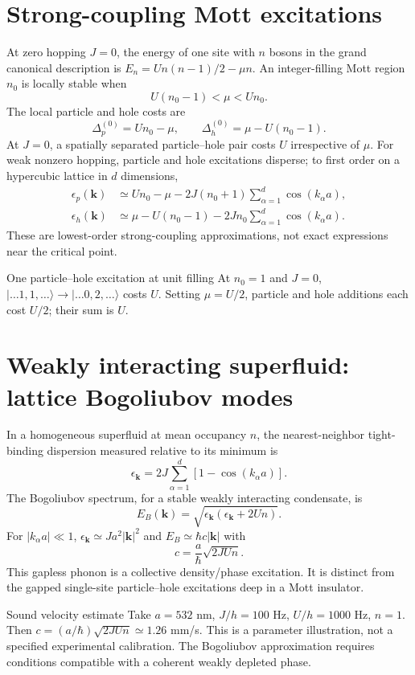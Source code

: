 \documentclass[11pt,a4paper]{article}
\begin{document}
\section{Strong-coupling Mott excitations}
At zero hopping $J=0$, the energy of one site with $n$ bosons in the grand canonical description is $E_n=U n(n-1)/2-\mu n$. An integer-filling Mott region $n_0$ is locally stable when
\begin{equation}U(n_0-1)<\mu<U n_0.\end{equation}
The local particle and hole costs are
\begin{equation}\boxed{\Delta_p^{(0)}=Un_0-\mu,\qquad\Delta_h^{(0)}=\mu-U(n_0-1).}\end{equation}
At $J=0$, a spatially separated particle--hole pair costs $U$ irrespective of $\mu$. For weak nonzero hopping, particle and hole excitations disperse; to first order on a hypercubic lattice in $d$ dimensions,
\begin{align}
\epsilon_p(\mathbf k)&\simeq Un_0-\mu-2J(n_0+1)\sum_{\alpha=1}^d\cos(k_\alpha a),\\
\epsilon_h(\mathbf k)&\simeq\mu-U(n_0-1)-2Jn_0\sum_{\alpha=1}^d\cos(k_\alpha a).
\end{align}
These are lowest-order strong-coupling approximations, not exact expressions near the critical point.
\begin{worked}{One particle--hole excitation at unit filling}
At $n_0=1$ and $J=0$, $|\dots1,1,\dots\rangle\to|\dots0,2,\dots\rangle$ costs $U$. Setting $\mu=U/2$, particle and hole additions each cost $U/2$; their sum is $U$.
\end{worked}
\section{Weakly interacting superfluid: lattice Bogoliubov modes}
In a homogeneous superfluid at mean occupancy $n$, the nearest-neighbor tight-binding dispersion measured relative to its minimum is
\begin{equation}\epsilon_{\mathbf k}=2J\sum_{\alpha=1}^d[1-\cos(k_\alpha a)].\end{equation}
The Bogoliubov spectrum, for a stable weakly interacting condensate, is
\begin{equation}\boxed{E_B(\mathbf k)=\sqrt{\epsilon_{\mathbf k}(\epsilon_{\mathbf k}+2Un)}.}\end{equation}
For $|k_\alpha a|\ll1$, $\epsilon_{\mathbf k}\simeq Ja^2|\mathbf k|^2$ and $E_B\simeq\hbar c|\mathbf k|$ with
\begin{equation}\boxed{c=\frac a\hbar\sqrt{2JUn}.}\end{equation}
This gapless phonon is a collective density/phase excitation. It is distinct from the gapped single-site particle--hole excitations deep in a Mott insulator.
\begin{worked}{Sound velocity estimate}
Take $a=532$ nm, $J/h=100$ Hz, $U/h=1000$ Hz, $n=1$. Then $c=(a/\hbar)\sqrt{2JUn}\simeq1.26$ mm/s. This is a parameter illustration, not a specified experimental calibration. The Bogoliubov approximation requires conditions compatible with a coherent weakly depleted phase.
\end{worked}
\end{document}
